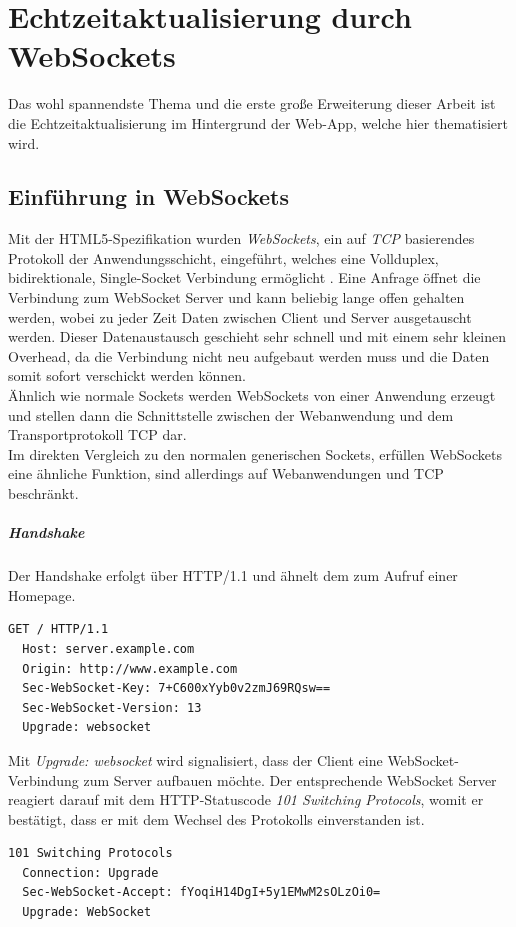 \chapter{Echtzeitaktualisierung durch WebSockets}
Das wohl spannendste Thema und die erste große Erweiterung dieser Arbeit ist die Echtzeitaktualisierung im Hintergrund der Web-App, welche hier thematisiert wird.

\section{Einführung in WebSockets}
Mit der HTML5-Spezifikation wurden \emph{WebSockets}, ein auf \emph{TCP} basierendes Protokoll der Anwendungsschicht, eingeführt, welches eine Vollduplex, bidirektionale, Single-Socket Verbindung ermöglicht \cite[S. 7]{ws}. Eine Anfrage öffnet die Verbindung zum WebSocket Server und kann beliebig lange offen gehalten werden, wobei zu jeder Zeit Daten zwischen Client und Server ausgetauscht werden. Dieser Datenaustausch geschieht sehr schnell und mit einem sehr kleinen Overhead, da die Verbindung nicht neu aufgebaut werden muss und die Daten somit sofort verschickt werden können.\\
Ähnlich wie \glqq normale\grqq{} Sockets werden WebSockets von einer Anwendung erzeugt und stellen dann die Schnittstelle zwischen der Webanwendung und dem Transportprotokoll TCP dar.\\
Im direkten Vergleich zu den normalen generischen Sockets, erfüllen WebSockets eine ähnliche Funktion, sind allerdings auf Webanwendungen und TCP beschränkt. 

\paragraph{Handshake} 
Der Handshake erfolgt über HTTP/1.1 und ähnelt dem zum Aufruf einer Homepage.
\\
\begin{lstlisting}[captionpos=b, caption=HTTP Request des Clients {\cite[S. 6]{rfc6455:handshake}}]
  GET / HTTP/1.1
  Host: server.example.com
  Origin: http://www.example.com
  Sec-WebSocket-Key: 7+C600xYyb0v2zmJ69RQsw==
  Sec-WebSocket-Version: 13
  Upgrade: websocket
\end{lstlisting}

Mit \emph{Upgrade: websocket} wird signalisiert, dass der Client eine WebSocket-Verbindung zum Server aufbauen möchte. Der entsprechende WebSocket Server reagiert darauf mit dem HTTP-Statuscode \emph{101 Switching Protocols}, womit er bestätigt, dass er mit dem Wechsel des Protokolls einverstanden ist.
\\
\begin{lstlisting}[captionpos=b, caption=HTTP Response des Servers {\cite[S. 8]{rfc6455:handshake}}]
  101 Switching Protocols
  Connection: Upgrade
  Sec-WebSocket-Accept: fYoqiH14DgI+5y1EMwM2sOLzOi0=
  Upgrade: WebSocket
\end{lstlisting}

